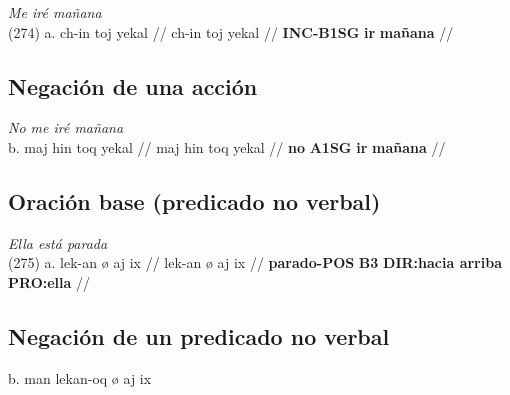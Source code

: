 \documentclass{article}%
\begin{document}
%
\par\medskip%
\ex
\textit{Me iré mañana} \\
\begingl
\gla (274) a. ch-in toj yekal //
\glb ch-in toj yekal //
\glc \textbf{INC-}\textbf{B1SG} \textbf{ir} \textbf{mañana} //
\endgl
\xe
%
\medskip%
\subsection{Negación de una acción}%
\label{subsec:Negacindeunaaccin}%

%
\par\medskip%
\ex
\textit{No me iré mañana} \\
\begingl
\gla b. maj hin toq yekal //
\glb maj hin toq yekal //
\glc \textbf{no} \textbf{A1SG} \textbf{ir} \textbf{mañana} //
\endgl
\xe
%
\medskip%
\subsection{Oración base (predicado no verbal)}%
\label{subsec:Oracinbase(predicadonoverbal)}%

%
\par\medskip%
\ex
\textit{Ella está parada} \\
\begingl
\gla (275) a. lek-an ø aj ix //
\glb lek-an ø aj ix //
\glc \textbf{parado-}\textbf{POS} \textbf{B3} \textbf{DIR:hacia arriba} \textbf{PRO:ella} //
\endgl
\xe
%
\medskip%
\subsection{Negación de un predicado no verbal}%
\label{subsec:Negacindeunpredicadonoverbal}%

%
b. man lekan{-}oq ø aj ix 

%
\end{document}
